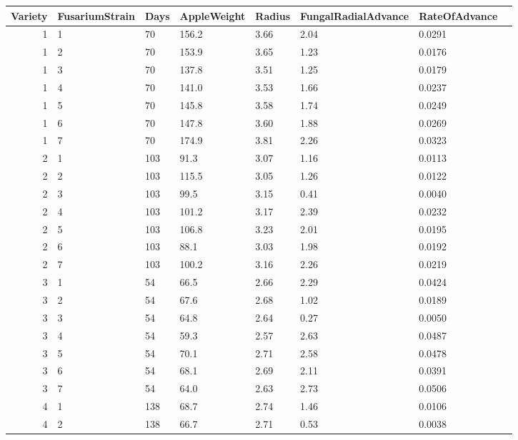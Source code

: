 \documentclass[11pt]{article}
\begin{document}
    \begin{tabular}{r|lllllll}
 Variety & FusariumStrain & Days & AppleWeight & Radius & FungalRadialAdvance & RateOfAdvance\\
\hline
	 1      & 1      &  70    & 156.2  & 3.66   & 2.04   & 0.0291\\
	 1      & 2      &  70    & 153.9  & 3.65   & 1.23   & 0.0176\\
	 1      & 3      &  70    & 137.8  & 3.51   & 1.25   & 0.0179\\
	 1      & 4      &  70    & 141.0  & 3.53   & 1.66   & 0.0237\\
	 1      & 5      &  70    & 145.8  & 3.58   & 1.74   & 0.0249\\
	 1      & 6      &  70    & 147.8  & 3.60   & 1.88   & 0.0269\\
	 1      & 7      &  70    & 174.9  & 3.81   & 2.26   & 0.0323\\
	 2      & 1      & 103    &  91.3  & 3.07   & 1.16   & 0.0113\\
	 2      & 2      & 103    & 115.5  & 3.05   & 1.26   & 0.0122\\
	 2      & 3      & 103    &  99.5  & 3.15   & 0.41   & 0.0040\\
	 2      & 4      & 103    & 101.2  & 3.17   & 2.39   & 0.0232\\
	 2      & 5      & 103    & 106.8  & 3.23   & 2.01   & 0.0195\\
	 2      & 6      & 103    &  88.1  & 3.03   & 1.98   & 0.0192\\
	 2      & 7      & 103    & 100.2  & 3.16   & 2.26   & 0.0219\\
	 3      & 1      &  54    &  66.5  & 2.66   & 2.29   & 0.0424\\
	 3      & 2      &  54    &  67.6  & 2.68   & 1.02   & 0.0189\\
	 3      & 3      &  54    &  64.8  & 2.64   & 0.27   & 0.0050\\
	 3      & 4      &  54    &  59.3  & 2.57   & 2.63   & 0.0487\\
	 3      & 5      &  54    &  70.1  & 2.71   & 2.58   & 0.0478\\
	 3      & 6      &  54    &  68.1  & 2.69   & 2.11   & 0.0391\\
	 3      & 7      &  54    &  64.0  & 2.63   & 2.73   & 0.0506\\
	 4      & 1      & 138    &  68.7  & 2.74   & 1.46   & 0.0106\\
	 4      & 2      & 138    &  66.7  & 2.71   & 0.53   & 0.0038\\

\end{tabular}
\end{document}

